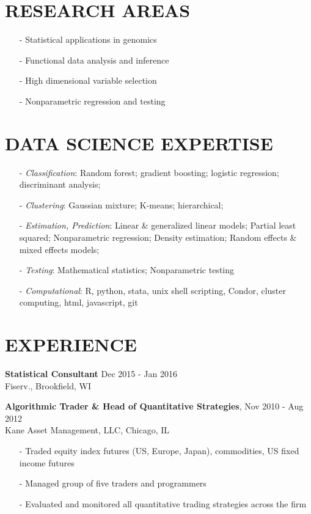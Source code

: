 \documentclass[11pt]{res} %
\begin{document}
\begin{resume}
\section{RESEARCH AREAS} 
\begin{itemize}[leftmargin=*] \itemsep -2pt %
\item[-]Statistical applications in genomics
\item[-]Functional data analysis and inference 
\item[-]High dimensional variable selection
\item[-]Nonparametric regression and testing
\end{itemize}

\section{DATA SCIENCE EXPERTISE} 
\begin{itemize}[leftmargin=*]
\item[-] {\emph{Classification}}: Random forest; gradient boosting; logistic regression; discriminant analysis;
\item[-] {\emph{Clustering}}: Gaussian mixture; K-means; hierarchical; 
\item[-] {\emph{Estimation, Prediction}}: Linear \& generalized linear models; Partial least squared; Nonparametric regression; Density estimation; Random effects \& mixed effects models; 
\item[-] {\emph{Testing}}: Mathematical statistics; Nonparametric testing
\item[-] {\emph{Computational}}: R, python, stata, unix shell scripting, Condor, cluster computing, html, javascript, git
\end{itemize}

\section{EXPERIENCE} 
{\bf{Statistical Consultant}} \hfill Dec 2015 - Jan 2016 \\
Fiserv., Brookfield, WI

{\bf{Algorithmic Trader \& Head of Quantitative Strategies}}, \hfill Nov 2010 - Aug 2012 \\
Kane Asset Management, LLC, Chicago, IL
   \begin{itemize} \itemsep -2pt %
   \item[-] Traded equity index futures (US, Europe, Japan), commodities, US fixed income futures
   \item[-] Managed group of five traders and programmers
   \item[-] Evaluated and monitored all quantitative trading strategies across the firm
   \end{itemize}


\end{resume}
\end{document}
